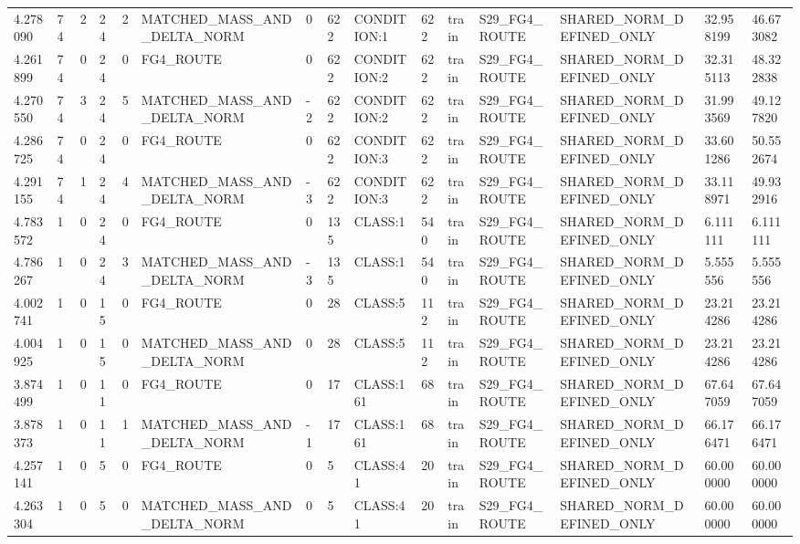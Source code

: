 \begin{tabular}{lllllllllllllll}
4.278090 & 74 & 2 & 24 & 2 & MATCHED\_MASS\_AND\_DELTA\_NORM & 0 & 622 & CONDITION:1 & 622 & train & S29\_FG4\_ROUTE & SHARED\_NORM\_DEFINED\_ONLY & 32.958199 & 46.673082 \\
4.261899 & 74 & 0 & 24 & 0 & FG4\_ROUTE & 0 & 622 & CONDITION:2 & 622 & train & S29\_FG4\_ROUTE & SHARED\_NORM\_DEFINED\_ONLY & 32.315113 & 48.322838 \\
4.270550 & 74 & 3 & 24 & 5 & MATCHED\_MASS\_AND\_DELTA\_NORM & -2 & 622 & CONDITION:2 & 622 & train & S29\_FG4\_ROUTE & SHARED\_NORM\_DEFINED\_ONLY & 31.993569 & 49.127820 \\
4.286725 & 74 & 0 & 24 & 0 & FG4\_ROUTE & 0 & 622 & CONDITION:3 & 622 & train & S29\_FG4\_ROUTE & SHARED\_NORM\_DEFINED\_ONLY & 33.601286 & 50.552674 \\
4.291155 & 74 & 1 & 24 & 4 & MATCHED\_MASS\_AND\_DELTA\_NORM & -3 & 622 & CONDITION:3 & 622 & train & S29\_FG4\_ROUTE & SHARED\_NORM\_DEFINED\_ONLY & 33.118971 & 49.932916 \\
4.783572 & 1 & 0 & 24 & 0 & FG4\_ROUTE & 0 & 135 & CLASS:1 & 540 & train & S29\_FG4\_ROUTE & SHARED\_NORM\_DEFINED\_ONLY & 6.111111 & 6.111111 \\
4.786267 & 1 & 0 & 24 & 3 & MATCHED\_MASS\_AND\_DELTA\_NORM & -3 & 135 & CLASS:1 & 540 & train & S29\_FG4\_ROUTE & SHARED\_NORM\_DEFINED\_ONLY & 5.555556 & 5.555556 \\
4.002741 & 1 & 0 & 15 & 0 & FG4\_ROUTE & 0 & 28 & CLASS:5 & 112 & train & S29\_FG4\_ROUTE & SHARED\_NORM\_DEFINED\_ONLY & 23.214286 & 23.214286 \\
4.004925 & 1 & 0 & 15 & 0 & MATCHED\_MASS\_AND\_DELTA\_NORM & 0 & 28 & CLASS:5 & 112 & train & S29\_FG4\_ROUTE & SHARED\_NORM\_DEFINED\_ONLY & 23.214286 & 23.214286 \\
3.874499 & 1 & 0 & 11 & 0 & FG4\_ROUTE & 0 & 17 & CLASS:161 & 68 & train & S29\_FG4\_ROUTE & SHARED\_NORM\_DEFINED\_ONLY & 67.647059 & 67.647059 \\
3.878373 & 1 & 0 & 11 & 1 & MATCHED\_MASS\_AND\_DELTA\_NORM & -1 & 17 & CLASS:161 & 68 & train & S29\_FG4\_ROUTE & SHARED\_NORM\_DEFINED\_ONLY & 66.176471 & 66.176471 \\
4.257141 & 1 & 0 & 5 & 0 & FG4\_ROUTE & 0 & 5 & CLASS:41 & 20 & train & S29\_FG4\_ROUTE & SHARED\_NORM\_DEFINED\_ONLY & 60.000000 & 60.000000 \\
4.263304 & 1 & 0 & 5 & 0 & MATCHED\_MASS\_AND\_DELTA\_NORM & 0 & 5 & CLASS:41 & 20 & train & S29\_FG4\_ROUTE & SHARED\_NORM\_DEFINED\_ONLY & 60.000000 & 60.000000 \\

\end{tabular}

